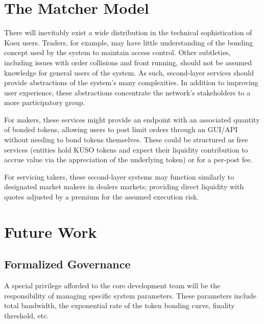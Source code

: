 \documentclass[10pt]{article}
\begin{document}
\section{The Matcher Model}\label{matcher-model}
There will inevitably exist a wide distribution in the technical sophistication of Kosu users. Traders, for example, may have little understanding of the bonding concept used by the system to maintain access control. Other subtleties, including issues with order collisions and front running, should not be assumed knowledge for general users of the system. As such, second-layer services should provide abstractions of the system’s many complexities. In addition to improving user experience, these abstractions concentrate the network's stakeholders to a more participatory group.
\medskip 

For makers, these services might provide an endpoint with an associated quantity of bonded tokens, allowing users to post limit orders through an GUI/API without needing to bond tokens themselves. These could be structured as free services (entities hold KUSO tokens and expect their liquidity contribution to accrue value via the appreciation of the underlying token) or for a per-post fee.
\medskip

For servicing takers, these second-layer systems may function similarly to designated market makers in dealers markets; providing direct liquidity with quotes adjusted by a premium for the assumed execution risk.
\clearpage
\pagebreak


\section{Future Work}\label{future-work}
\subsection{Formalized Governance}\label{future-work-governance}
A special privilege afforded to the core development team will be the responsibility of managing specific system parameters. These parameters include total bandwidth, the exponential rate of the token bonding curve, finality threshold, etc.
\medskip
\end{document}
